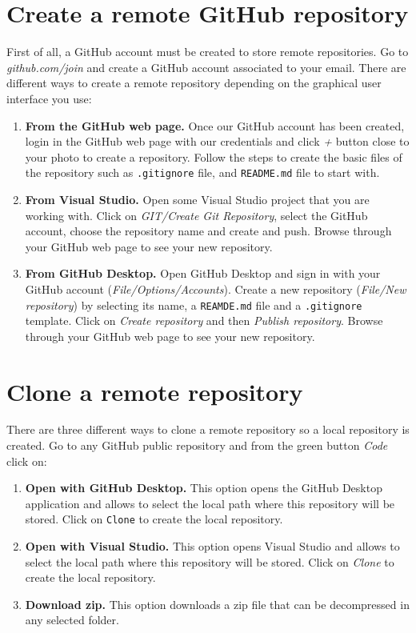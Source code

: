  
 \section{Create a remote  GitHub repository}
 
 First of all, a GitHub account must be created to store remote repositories. 
 Go to \textit{github.com/join} and create a GitHub account associated to your email.
 There are different ways to create a remote repository depending on the graphical user 
 interface you use: 
   
 \begin{enumerate}
 \item {\bf From the GitHub web page.} Once our GitHub account has been created, login in the GitHub web page 
 with our credentials and click \textit{+} button close to your photo to create a repository. 
 Follow the steps to create the basic files of the repository such as \texttt{.gitignore} file,  
 and \texttt{README.md} file to start with. 
   
 \item {\bf From Visual Studio. } 
 Open some Visual Studio project that you are working with. 
Click on \textit{GIT/Create Git Repository}, 
 select the GitHub account, choose the repository name and create and push.
Browse through your  GitHub web page to see your new repository. 
 
 \item {\bf From GitHub Desktop. }
  Open GitHub Desktop and sign in with your GitHub account 
  (\textit{File/Options/Accounts}).  
  Create a new repository (\textit{File/New repository}) by selecting its name, 
  a \texttt{REAMDE.md} file and a \texttt{.gitignore} template. 
  Click on \textit{Create repository} and then \textit{Publish repository}.
  Browse through your GitHub web page to see your new repository.
  \end{enumerate} 



\section{Clone a remote repository}

There are three different ways to clone a remote repository 
so a local repository is created. 
Go to any GitHub public repository and from the green button  \textit{Code}
click on: 
 \begin{enumerate}
 \item {\bf  Open with GitHub Desktop.}
 This option opens the GitHub Desktop application and allows to select the  
 local path where this repository will be stored. 
  Click on \texttt{Clone} to create the local repository. 
 \item {\bf  Open with Visual Studio. } 
 This option opens Visual Studio and allows to select the local path where this repository 
  will be stored. Click on \textit{Clone} to create the local repository. 
 \item {\bf Download zip. } 
 This option downloads a zip file that can be decompressed in any selected folder.
  
\end{enumerate} 



